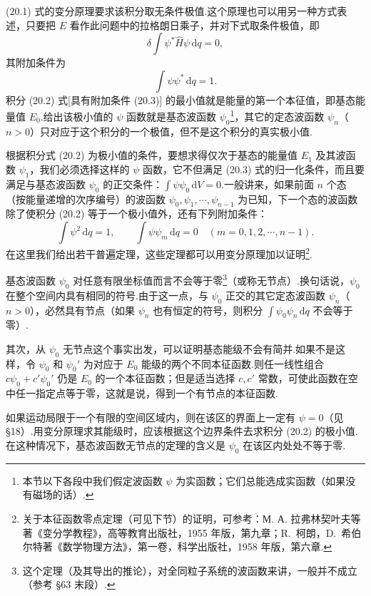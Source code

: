 (20.1) 式的变分原理要求该积分取无条件极值.这个原理也可以用另一种方式表述，只要把 $E$ 看作此问题中的拉格朗日乘子，并对下式取条件极值，即
\begin{equation}
  \delta\int\psi^*\hat{H}\psi\,\mathrm{d}q=0,
\end{equation}
其附加条件为
\begin{equation}
  \int\psi\psi^*\,\mathrm{d}q=1.
\end{equation}
积分 (20.2) 式[具有附加条件 (20.3)] 的最小值就是能量的第一个本征值，即基态能量值 $E_0$.给出该极小值的 $\psi$ 函数就是基态波函数 $\psi_0$\footnote{本节以下各段中我们假定波函数 $\psi$ 为实函数；它们总能选成实函数（如果没有磁场的话）.}，其它的定态波函数 $\psi_n$（$n>0$）只对应于这个积分的一个极值，但不是这个积分的真实极小值.

根据积分式 (20.2) 为极小值的条件，要想求得仅次于基态的能量值 $E_1$ 及其波函数 $\psi_1$，我们必须选择这样的 $\psi$ 函数，它不但满足 (20.3) 式的归一化条件，而且要满足与基态波函数 $\psi_0$ 的正交条件：$\int\psi\psi_0\,\mathrm{d}V=0$.一般讲来，如果前面 $n$ 个态（按能量递增的次序编号）的波函数 $\psi_0,\psi_1,\cdots,\psi_{n-1}$ 为已知，下一个态的波函数除了使积分 (20.2) 等于一个极小值外，还有下列附加条件：
\begin{equation}
  \int\psi^2\,\mathrm{d}q=1,\qquad
  \int\psi\psi_m\,\mathrm{d}q=0\quad
  \left(m=0,1,2,\cdots,n-1\right).
\end{equation}
在这里我们给出若干普遍定理，这些定理都可以用变分原理加以证明\footnote{关于本征函数零点定理（可见下节）的证明，可参考：М. А. 拉弗林契叶夫等著《变分学教程》，高等教育出版社，1955 年版，第九章；R.~柯朗，D.~希伯尔特著《数学物理方法》，第一卷，科学出版社，1958 年版，第六章.}.

基态波函数 $\psi_0$ 对任意有限坐标值而言不会等于零\footnote{这个定理（及其导出的推论），对全同粒子系统的波函数来讲，一般并不成立（参考 §63 末段）.}（或称无节点）.换句话说，$\psi_0$ 在整个空间内具有相同的符号.由于这一点，与 $\psi_0$ 正交的其它定态波函数 $\psi_n$（$n>0$），必然具有节点（如果 $\psi_n$ 也有恒定的符号，则积分 $\int\psi_0\psi_n\,\mathrm{d}q$ 不会等于零）.

其次，从 $\psi_0$ 无节点这个事实出发，可以证明基态能级不会有简并.如果不是这样，令 $\psi_0$ 和 $\psi_0'$ 为对应于 $E_0$ 能级的两个不同本征函数.则任一线性组合 $c\psi_0+c'\psi_0'$ 仍是 $E_0$ 的一个本征函数；但是适当选择 $c,c'$ 常数，可使此函数在空中任一指定点等于零，这就是说，得到一个有节点的本征函数.

如果运动局限于一个有限的空间区域内，则在该区的界面上一定有 $\psi=0$（见§18）.用变分原理求其能级时，应该根据这个边界条件去求积分 (20.2) 的极小值.在这种情况下，基态波函数无节点的定理的含义是 $\psi_0$ 在该区内处处不等于零.

